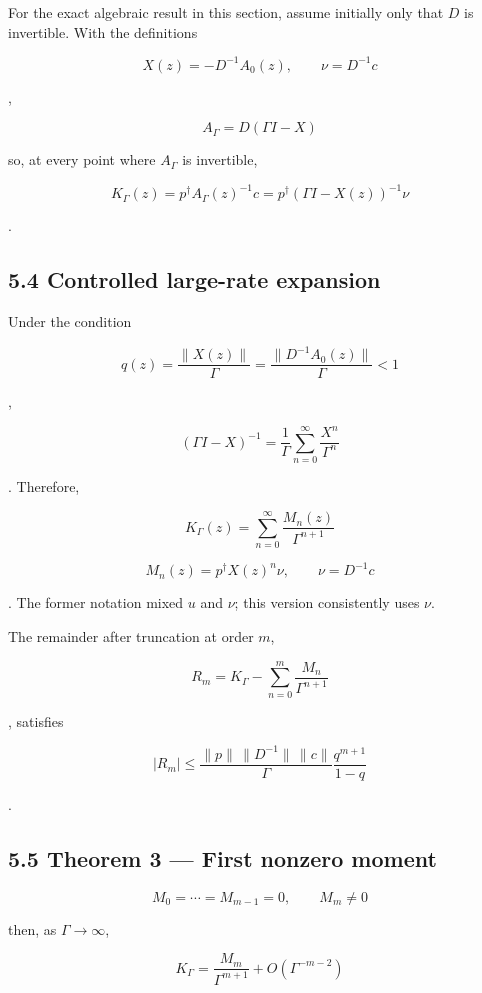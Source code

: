 \documentclass[
  10pt,
  a4paper,
]{article}
\begin{document}
For the exact algebraic result in this section, assume initially only
that \(D\) is invertible. With the definitions

\[
X(z)=-D^{-1}A_0(z),
\qquad
\nu=D^{-1}c
\]

,

\[
A_\Gamma
=D(\Gamma I-X)
\]

so, at every point where \(A_\Gamma\) is invertible,

\[
\boxed{
K_\Gamma(z)
=p^\dagger A_\Gamma(z)^{-1}c
=p^\dagger(\Gamma I-X(z))^{-1}\nu
}
\]

.

\subsection{5.4 Controlled large-rate
expansion}\label{controlled-large-rate-expansion}

Under the condition

\[
q(z)=\frac{\|X(z)\|}{\Gamma}
=\frac{\|D^{-1}A_0(z)\|}{\Gamma}<1
\]

,

\[
(\Gamma I-X)^{-1}
=\frac1\Gamma
\sum_{n=0}^{\infty}\frac{X^n}{\Gamma^n}
\]

. Therefore,

\[
\boxed{
K_\Gamma(z)
=\sum_{n=0}^{\infty}
\frac{M_n(z)}{\Gamma^{n+1}}
}
\]

\[
\boxed{
M_n(z)=p^\dagger X(z)^n\nu,
\qquad
\nu=D^{-1}c
}
\]

. The former notation mixed \(u\) and \(\nu\); this version consistently
uses \(\nu\).

The remainder after truncation at order \(m\),

\[
R_m
=K_\Gamma-
\sum_{n=0}^{m}\frac{M_n}{\Gamma^{n+1}}
\]

, satisfies

\[
\boxed{
|R_m|
\le
\frac{\|p\|\,\|D^{-1}\|\,\|c\|}{\Gamma}
\frac{q^{m+1}}{1-q}
}
\]

.

\subsection{5.5 Theorem 3 --- First nonzero
moment}\label{theorem-3-first-nonzero-moment}

\[
M_0=\cdots=M_{m-1}=0,
\qquad
M_m\neq0
\]

then, as \(\Gamma\to\infty\),

\[
\boxed{
K_\Gamma
=\frac{M_m}{\Gamma^{m+1}}
+O(\Gamma^{-m-2})
}
\]
\end{document}
